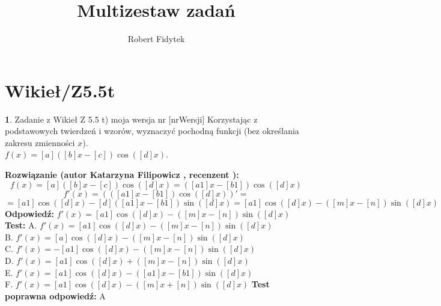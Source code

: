 \documentclass[12pt, a4paper]{article}
\title{Multizestaw zadań}
\author{Robert Fidytek}
\date{}
\theoremstyle{definition} %
\newtheorem{zad}{}
\newcommand{\kategoria}[1]{\section{#1}} %
\newcommand{\zadStart}[1]{\begin{zad}#1\newline} %
\newcommand{\zadStop}{\end{zad}}   %
\newcommand{\rozwStart}[2]{\noindent \textbf{Rozwiązanie (autor #1 , recenzent #2): }\newline} %
\newcommand{\rozwStop}{\newline}                                            %
\newcommand{\odpStart}{\noindent \textbf{Odpowiedź:}\newline}    %
\newcommand{\odpStop}{\newline}                                             %
\newcommand{\testStart}{\noindent \textbf{Test:}\newline} %
\newcommand{\testStop}{\newline} %
\newcommand{\kluczStart}{\noindent \textbf{Test poprawna odpowiedź:}\newline} %
\newcommand{\kluczStop}{\newline} %
\begin{document}
\maketitle


\kategoria{Wikieł/Z5.5t}
\zadStart{Zadanie z Wikieł Z 5.5 t) moja wersja nr [nrWersji]}
Korzystając z podstawowych twierdzeń i wzorów, wyznaczyć pochodną funkcji (bez określania zakresu zmienności $x$).\\ 
$f(x)=[a]([b]x-[c])\cos([d]x)$.
\zadStop
\rozwStart{Katarzyna Filipowicz}{}
$$f(x)=[a]([b]x-[c])\cos([d]x)=([a1]x-[b1])\cos([d]x)$$
$$f'(x)=\left(([a1]x-[b1])\cos([d]x)\right)' = $$
$$ = [a1]\cos([d]x)-[d]([a1]x-[b1])\sin([d]x)=[a1]\cos([d]x)-([m]x-[n])\sin([d]x)
$$
\rozwStop
\odpStart
$ f'(x)=[a1]\cos([d]x)-([m]x-[n])\sin([d]x)$
\odpStop
\testStart
A. $ f'(x)=[a1]\cos([d]x)-([m]x-[n])\sin([d]x)$\\
B. $ f'(x)=[a]\cos([d]x)-([m]x-[n])\sin([d]x)$\\
C. $ f'(x)=-[a1]\cos([d]x)-([m]x-[n])\sin([d]x)$ \\
D. $ f'(x)=[a1]\cos([d]x)+([m]x-[n])\sin([d]x)$\\
E. $ f'(x)=[a1]\cos([d]x)-([a1]x-[b1])\sin([d]x)$\\
F. $ f'(x)=[a1]\cos([d]x)-([m]x+[n])\sin([d]x)$
\testStop
\kluczStart
A
\kluczStop
\end{document}
